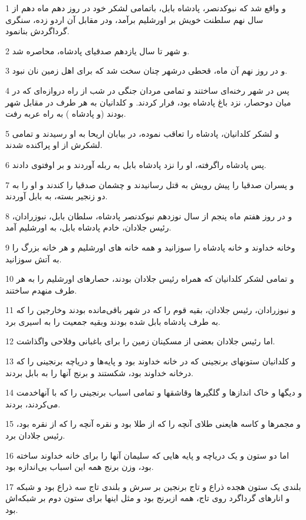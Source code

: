 \par 1 و واقع شد که نبوکدنصر، پادشاه بابل، باتمامی لشکر خود در روز دهم ماه دهم از سال نهم سلطنت خویش بر اورشلیم برآمد، ودر مقابل آن اردو زده، سنگری گرداگردش بنانمود.
\par 2 و شهر تا سال یازدهم صدقیای پادشاه، محاصره شد.
\par 3 و در روز نهم آن ماه، قحطی درشهر چنان سخت شد که برای اهل زمین نان نبود.
\par 4 پس در شهر رخنه‌ای ساختند و تمامی مردان جنگی در شب از راه دروازه‌ای که در میان دوحصار، نزد باغ پادشاه بود، فرار کردند. و کلدانیان به هر طرف در مقابل شهر بودند (و پادشاه ) به راه عربه رفت.
\par 5 و لشکر کلدانیان، پادشاه را تعاقب نموده، در بیابان اریحا به او رسیدند و تمامی لشکرش از او پراکنده شدند.
\par 6 پس پادشاه راگرفته، او را نزد پادشاه بابل به ربله آوردند و بر اوفتوی دادند.
\par 7 و پسران صدقیا را پیش رویش به قتل رسانیدند و چشمان صدقیا را کندند و او را به دو زنجیر بسته، به بابل آوردند.
\par 8 و در روز هفتم ماه پنجم از سال نوزدهم نبوکدنصر پادشاه، سلطان بابل، نبوزرادان، رئیس جلادان، خادم پادشاه بابل، به اورشلیم آمد.
\par 9 وخانه خداوند و خانه پادشاه را سوزانید و همه خانه های اورشلیم و هر خانه بزرگ را به آتش سوزانید.
\par 10 و تمامی لشکر کلدانیان که همراه رئیس جلادان بودند، حصارهای اورشلیم را به هر طرف منهدم ساختند.
\par 11 و نبوزرادان، رئیس جلادان، بقیه قوم را که در شهر باقی‌مانده بودند وخارجین را که به طرف پادشاه بابل شده بودند وبقیه جمعیت را به اسیری برد.
\par 12 اما رئیس جلادان بعضی از مسکینان زمین را برای باغبانی وفلاحی واگذاشت.
\par 13 و کلدانیان ستونهای برنجینی که در خانه خداوند بود و پایه‌ها و دریاچه برنجینی را که درخانه خداوند بود، شکستند و برنج آنها را به بابل بردند.
\par 14 و دیگها و خاک اندازها و گلگیرها وقاشقها و تمامی اسباب برنجینی را که با آنهاخدمت می‌کردند، بردند.
\par 15 و مجمرها و کاسه هایعنی طلای آنچه را که از طلا بود و نقره آنچه را که از نقره بود، رئیس جلادان برد.
\par 16 اما دو ستون و یک دریاچه و پایه هایی که سلیمان آنها را برای خانه خداوند ساخته بود، وزن برنج همه این اسباب بی‌اندازه بود.
\par 17 بلندی یک ستون هجده ذراع و تاج برنجین بر سرش و بلندی تاج سه ذراع بود و شبکه و انارهای گرداگرد روی تاج، همه ازبرنج بود و مثل اینها برای ستون دوم بر شبکه‌اش بود.
